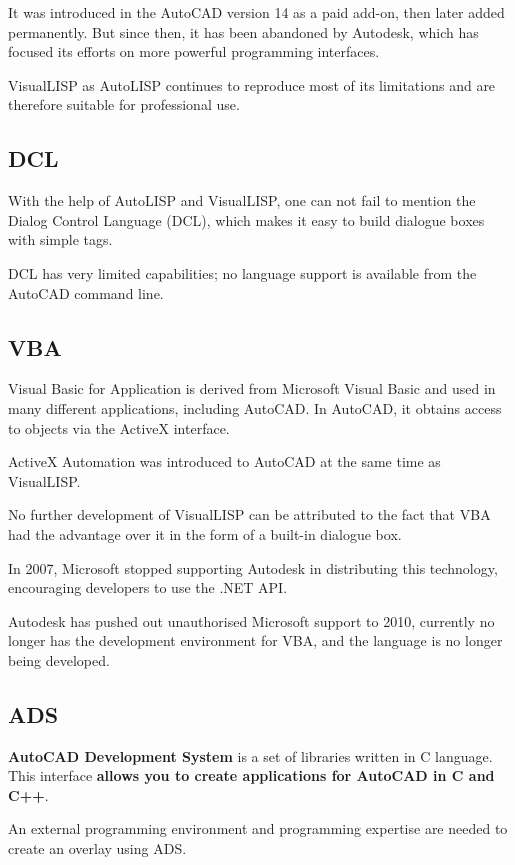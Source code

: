 \documentclass[a4paper, 11pt, article]{report}
\begin{document}
It was introduced in the AutoCAD version 14 as a paid add-on, then later added permanently. But since then, it has been abandoned by Autodesk, which has focused its efforts on more powerful programming interfaces.

VisualLISP as AutoLISP continues to reproduce most of its limitations and are therefore suitable for professional use.

\subsection{DCL}
   
With the help of AutoLISP and VisualLISP, one can not fail to mention the Dialog Control Language (DCL), which makes it easy to build dialogue boxes with simple tags.

DCL has very limited capabilities; no language support is available from the AutoCAD command line.

\subsection{VBA}

Visual Basic for Application is derived from Microsoft Visual Basic and used in many different applications, including AutoCAD. In AutoCAD, it obtains access to objects via the ActiveX interface.

ActiveX Automation was introduced to AutoCAD at the same time as VisualLISP.

No further development of VisualLISP can be attributed to the fact that VBA had the advantage over it in the form of a built-in dialogue box.

In 2007, Microsoft stopped supporting Autodesk in distributing this technology, encouraging developers to use the .NET API.

Autodesk has pushed out unauthorised Microsoft support to 2010, currently no longer has the development environment for VBA, and the language is no longer being developed.

\subsection{ADS}

\textbf{AutoCAD Development System} is a set of libraries written in C language. This interface \textbf{allows you to create applications for AutoCAD in C and C++}.

An external programming environment and programming expertise are needed to create an overlay using ADS.
\end{document}
